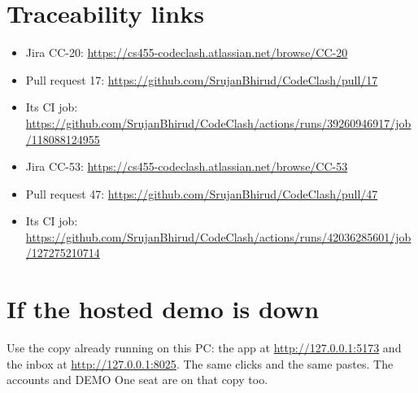 \documentclass[10pt,a4paper]{article}
\begin{document}
\section{Traceability links}

\begin{itemize}
  \item Jira CC-20: \url{https://cs455-codeclash.atlassian.net/browse/CC-20}
  \item Pull request 17: \url{https://github.com/SrujanBhirud/CodeClash/pull/17}
  \item Its CI job: \url{https://github.com/SrujanBhirud/CodeClash/actions/runs/39260946917/job/118088124955}
  \item Jira CC-53: \url{https://cs455-codeclash.atlassian.net/browse/CC-53}
  \item Pull request 47: \url{https://github.com/SrujanBhirud/CodeClash/pull/47}
  \item Its CI job: \url{https://github.com/SrujanBhirud/CodeClash/actions/runs/42036285601/job/127275210714}
\end{itemize}

\section{If the hosted demo is down}

Use the copy already running on this PC: the app at \url{http://127.0.0.1:5173} and the inbox at \url{http://127.0.0.1:8025}. The same clicks and the same pastes. The accounts and DEMO One seat are on that copy too.
\end{document}
